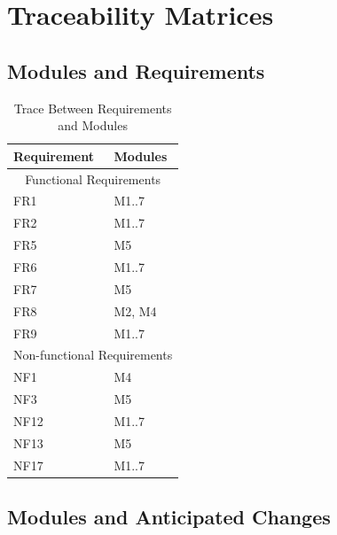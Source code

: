 \documentclass[12,english]{article}
\begin{document}
\section{Traceability Matrices}

\subsection{Modules and Requirements}

\begin{table}[!htbp]
      \begin{tabular}{ll}
        \toprule
        Requirement & Modules \\
        \midrule
        \multicolumn{2}{c}{Functional Requirements} \\
        \midrule
        FR1 & M1..7 \\
        FR2 & M1..7 \\
        FR5 & M5 \\
        FR6 & M1..7 \\
        FR7 & M5 \\
        FR8 & M2, M4 \\
        FR9 & M1..7\\
        \midrule
        \multicolumn{2}{c}{Non-functional Requirements} \\
        \midrule
        NF1 & M4 \\
        NF3 & M5 \\
        NF12 & M1..7 \\
        NF13 & M5 \\
        NF17 & M1..7 \\
        \bottomrule
        \end{tabular}
        \caption{Trace Between Requirements and Modules}
        \makeatletter
           \def\rulecolor#1#{\CT@arc{#1}}
           \def\CT@arc#1#2{%
           \ifdim\baselineskip=\z@\noalign\fi
           {\gdef\CT@arc@{\color#1{#2}}}}
           \let\CT@arc@\relax
        \makeatother
        \label{Table 2}
        \end{table}

\FloatBarrier
\subsection{Modules and Anticipated Changes}
\end{document}
